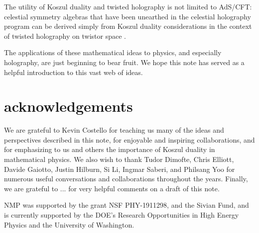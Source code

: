 \documentclass[11pt]{amsart}
\begin{document}
\begin{itemize}
The utility of Koszul duality and twisted holography is not limited to AdS/CFT: celestial symmetry algebras that have been unearthed in the celestial holography program can be derived simply from Koszul duality considerations in the context of twisted holography on twistor space \cite{CP2}. 
\end{itemize}

The applications of these mathematical ideas to physics, and especially holography, are just beginning to bear fruit. We hope this note has served as a helpful introduction to this vast web of ideas. 


\section{acknowledgements} We are grateful to Kevin Costello for teaching us many of the ideas and perspectives described in this note, for enjoyable and inspiring collaborations, and for emphasizing to us and others the importance of Koszul duality in mathematical physics. We also wish to thank Tudor Dimofte, Chris Elliott, Davide Gaiotto, Justin Hilburn, Si Li, Ingmar Saberi, and Philsang Yoo for numerous useful conversations and collaborations throughout the years. Finally, we are grateful to ... for very helpful comments on a draft of this note. 

NMP was supported by the grant NSF PHY-1911298, and the Sivian Fund, and is currently supported by the DOE's Research Opportunities in High Energy Physics and the University of Washington. 



\printbibliography
\end{document}

